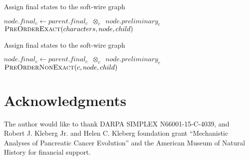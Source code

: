 \documentclass[12pt]{article}
\begin{document}
{\begin{algorithm}
\begin{algorithmic}[1]
		\EndFor
		\EndFunction
	\end{algorithmic}
\end{algorithm}


\begin{algorithm}
	\caption{Assign final states to the soft-wire graph}
	\label{Alg:pre-order-traversal}
	\begin{algorithmic}[1]
		    \State $node.final_c \gets parent.final_c \;\;\otimes_c\;\; node.preliminary_c$
		  \EndFor
		    \State $\Call{PreOrderExact}{characters, node, child}$
		  \EndFor
		\EndFunction
\end{algorithmic}
\end{algorithm}


\begin{algorithm}
	\caption{Assign final states to the soft-wire graph}
	\label{Alg:pre-order-traversal}
	\begin{algorithmic}[1]
		\State $node.final_c \gets parent.final_c \;\;\otimes_c\;\; node.preliminary_c$
		  \State $\Call{PreOrderNonExact}{c, node, child}$
		\EndFor
		\EndFunction
	\end{algorithmic}
\end{algorithm}

\restoregeometry
}


\section*{Acknowledgments}
The author would like to thank DARPA SIMPLEX N66001-15-C-4039, and Robert J. Kleberg Jr. and Helen C. Kleberg foundation grant ``Mechanistic Analyses of Pancreatic Cancer Evolution'' and the American Museum of Natural History for financial support. 

%
%
\newpage
%

%
\end{document}
